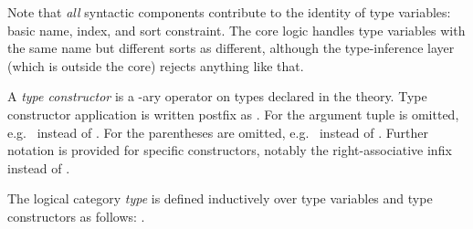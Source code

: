 \begin{isabellebody}
\begin{isamarkuptext}
  Note that \emph{all} syntactic components contribute to the identity
  of type variables: basic name, index, and sort constraint.  The core
  logic handles type variables with the same name but different sorts
  as different, although the type-inference layer (which is outside
  the core) rejects anything like that.

  A \emph{type constructor}  is a -ary operator
  on types declared in the theory.  Type constructor application is
  written postfix as .  For
   the argument tuple is omitted, e.g.\ 
  instead of .  For  the parentheses
  are omitted, e.g.\  instead of .
  Further notation is provided for specific constructors, notably the
  right-associative infix  instead of .
  
  The logical category \emph{type} is defined inductively over type
  variables and type constructors as follows: .


\end{isamarkuptext}
\end{isabellebody}
